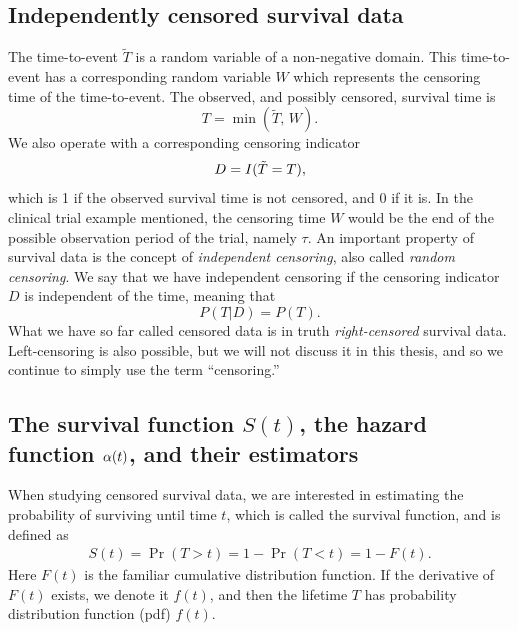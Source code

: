 \subsection{Independently censored survival data}\label{subsec:survdata}
The time-to-event $\tilde{T}$ is a random variable of a non-negative domain.
This time-to-event has a corresponding random variable $W$ which represents the censoring time of the time-to-event.
The observed, and possibly censored, survival time is
\begin{equation*}
    T=\min(\tilde{T},\,W).
\end{equation*}
We also operate with a corresponding censoring indicator
\begin{equation*}
    D=I(\tilde{T}=T),
\end{equation*}
which is 1 if the observed survival time is not censored, and 0 if it is.
In the clinical trial example mentioned, the censoring time $W$ would be the end of the possible observation period of the trial, namely $\tau$.
An important property of survival data is the concept of \textit{independent censoring}, also called \textit{random censoring}.
We say that we have independent censoring if the censoring indicator $D$ is independent of the time, meaning that
\begin{equation*}
    P(T|D)=P(T).
\end{equation*}
What we have so far called censored data is in truth \textit{right-censored} survival data.
Left-censoring is also possible, but we will not discuss it in this thesis, and so we continue to simply use the term ``censoring.''

\subsection{The survival function $S(t)$, the hazard function $\alpha(t)$, and their estimators}
When studying censored survival data, we are interested in estimating the probability of surviving until time $t$, which is called the survival function, and is defined as
\begin{align*}
    S(t)=\Pr(T>t)=1-\Pr(T<t)=1-F(t).
\end{align*}
Here $F(t)$ is the familiar cumulative distribution function.
If the derivative of $F(t)$ exists, we denote it $f(t)$, and then the lifetime $T$ has probability distribution function (pdf) $f(t)$.


